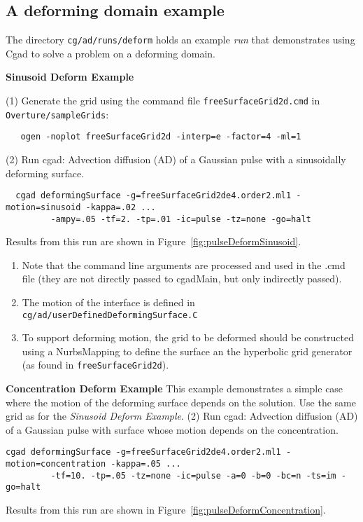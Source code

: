 \documentclass[10pt]{article}
\begin{document}
\clearpage
\subsection{A deforming domain example} \label{sec:deform}


The directory {\tt cg/ad/runs/deform} holds an example {\em run} that demonstrates using Cgad to solve 
a problem on a deforming domain.



\noindent \textbf{Sinusoid Deform Example}

\noindent (1) Generate the grid using the command file {\tt freeSurfaceGrid2d.cmd} in {\tt Overture/sampleGrids}:
\begin{verbatim}
   ogen -noplot freeSurfaceGrid2d -interp=e -factor=4 -ml=1 
\end{verbatim}

\noindent (2) Run cgad: Advection diffusion (AD) of a Gaussian pulse with a sinusoidally deforming surface. 
\begin{verbatim}
  cgad deformingSurface -g=freeSurfaceGrid2de4.order2.ml1 -motion=sinusoid -kappa=.02 ...
         -ampy=.05 -tf=2. -tp=.01 -ic=pulse -tz=none -go=halt
\end{verbatim}
Results from this run are shown in Figure~\ref{fig:pulseDeformSinusoid}.

\begin{enumerate}
  \item Note that the command line arguments are processed and used in the .cmd file (they are not directly passed
to cgadMain, but only indirectly passed). 
  \item The motion of the interface is defined in {\tt cg/ad/userDefinedDeformingSurface.C}
  \item To support deforming motion, the grid to be deformed should be constructed using a NurbsMapping to define
    the surface an the hyperbolic grid generator (as found in {\tt freeSurfaceGrid2d}).
\end{enumerate}



\noindent \textbf{Concentration Deform Example}
This example demonstrates a simple case where the motion of the deforming surface depends on the solution.
  Use the same grid as for the {\em  Sinusoid Deform Example}.
\noindent (2) Run cgad: Advection diffusion (AD) of a Gaussian pulse with surface whose motion depends 
  on the concentration.
\begin{verbatim}
cgad deformingSurface -g=freeSurfaceGrid2de4.order2.ml1 -motion=concentration -kappa=.05 ...
         -tf=10. -tp=.05 -tz=none -ic=pulse -a=0 -b=0 -bc=n -ts=im -go=halt
\end{verbatim}
Results from this run are shown in Figure~\ref{fig:pulseDeformConcentration}.
\end{document}
